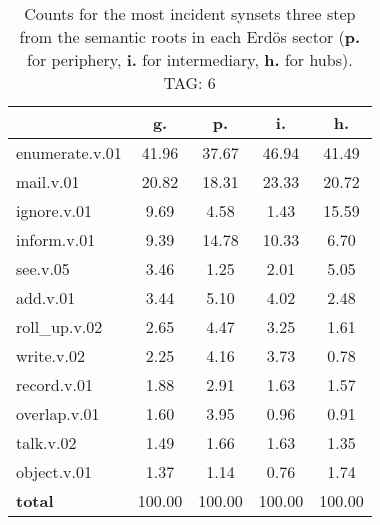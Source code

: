 \begin{table}[h!]
\begin{center}
\begin{tabular}{| l || c | c | c | c |}\hline
 & {\bf g.} & {\bf p.} & {\bf i.} & {\bf h.} \\\hline\hline
enumerate.v.01 & 41.96  & 37.67  & 46.94  & 41.49 \\\hline
mail.v.01 & 20.82  & 18.31  & 23.33  & 20.72 \\\hline
ignore.v.01 & 9.69  & 4.58  & 1.43  & 15.59 \\\hline
inform.v.01 & 9.39  & 14.78  & 10.33  & 6.70 \\\hline
see.v.05 & 3.46  & 1.25  & 2.01  & 5.05 \\\hline
add.v.01 & 3.44  & 5.10  & 4.02  & 2.48 \\\hline
roll\_up.v.02 & 2.65  & 4.47  & 3.25  & 1.61 \\\hline
write.v.02 & 2.25  & 4.16  & 3.73  & 0.78 \\\hline
record.v.01 & 1.88  & 2.91  & 1.63  & 1.57 \\\hline
overlap.v.01 & 1.60  & 3.95  & 0.96  & 0.91 \\\hline
talk.v.02 & 1.49  & 1.66  & 1.63  & 1.35 \\\hline
object.v.01 & 1.37  & 1.14  & 0.76  & 1.74 \\\hline\hline
{{\bf total}} & 100.00  & 100.00  & 100.00  & 100.00 \\\hline
\end{tabular}
\caption{Counts for the most incident synsets three step from the semantic roots in each Erd\"os sector ({\bf p.} for periphery, {\bf i.} for intermediary, {\bf h.} for hubs). TAG: 6}
\end{center}
\end{table}